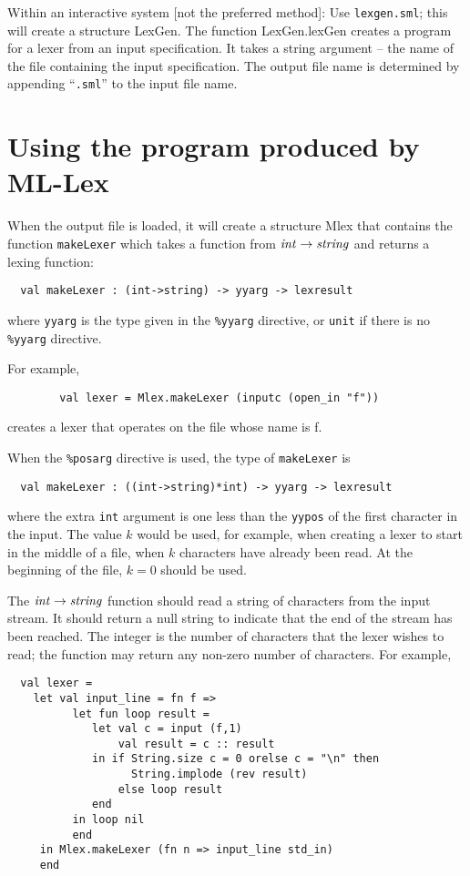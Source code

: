 Within an interactive system [not the preferred method]:
Use {\tt lexgen.sml}; this will create a structure LexGen.  The function
LexGen.lexGen creates a program for a lexer from an input
specification.  It takes a string argument -- the name of the file
containing the input specification.  The output file name is
determined by appending ``{\tt .sml}'' to the input file name.

\section{Using the program produced by ML-Lex}

When the output file is loaded, it will create a structure Mlex that
contains the function {\tt makeLexer} which takes a function from
${\it int} \rightarrow {\it string}$ and returns a lexing function:

\begin{verbatim}
  val makeLexer : (int->string) -> yyarg -> lexresult
\end{verbatim}
where {\tt yyarg} is the type given in the {\tt \%yyarg} directive,
or {\tt unit} if there is no {\tt \%yyarg} directive.

For example,

\begin{verbatim}
        val lexer = Mlex.makeLexer (inputc (open_in "f"))
\end{verbatim}

creates a lexer that operates on the file whose name is f.

When the {\tt \%posarg} directive is used, the type of
{\tt makeLexer} is
\begin{verbatim}
  val makeLexer : ((int->string)*int) -> yyarg -> lexresult
\end{verbatim}
where the extra {\tt int} argument is one less than the {\tt yypos}
of the first character in the input.  The value $k$ would be used,
for example, when creating
a lexer to start in the middle of a file, when $k$ characters have
already been read.  At the beginning of the file, $k=0$ should be used.

The ${\it int} \rightarrow {\it string}$ function
should read a string of characters
from the input stream.  It should return a null string to indicate
that the end of the stream has been reached.  The integer is the
number of characters that the lexer wishes to read; the function may
return any non-zero number of characters.  For example,

\begin{verbatim}
  val lexer =
    let val input_line = fn f =>
          let fun loop result =
             let val c = input (f,1)
                 val result = c :: result
             in if String.size c = 0 orelse c = "\n" then
                   String.implode (rev result)
                 else loop result
             end
          in loop nil
          end
     in Mlex.makeLexer (fn n => input_line std_in)
     end
\end{verbatim}

